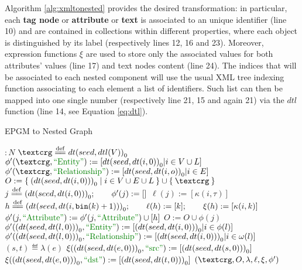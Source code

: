 Algorithm \vref{alg:xmltonested} provides the desired transformation: in particular, each \textbf{tag node} or \textbf{attribute} or \textbf{text} is associated to an unique identifier (line 10) and are contained in collections within different properties, where each object is distinguished by its label (respectively lines 12, 16 and 23). Moreover, expression functions $\xi$ are used to store only the associated values for both attributes' values (line 17) and text nodes content (line 24).
 The indices that will be associated to each nested component will use the usual XML tree indexing function \cite{Liu16} associating to each element a list of identifiers. Such list can then be mapped into one single number (respectively line 21, 15 and again 21) via the $dtl$ function (line 14, see Equation \vref{eq:dtl}). 

\begin{algorithm}[!t]
	\caption{EPGM to Nested Graph}\label{alg:epgmtoN}
	{
		\begin{minipage}{\linewidth}
			\begin{algorithmic}[1]
				 $\colon N$ 
				\State $\ngraph \eqdef {dt(seed,dtl(V))}_0$
				\State $\phi'(\ngraph,\ONTA):=[{dt(seed,dt(i,0))}_0|i\in V\cup L]$
				\State $\phi'(\ngraph,\RELA):=[{dt(seed,dt(i,o))}_0|i\in E]$
				\State $O:= \Set{\zsed{dt(seed,dt(i, 0))}|i\in V\cup E\cup L}\cup\Set{\ngraph}$
				\State $j \overset{\mathrm{def}}{=\mathrel{\mkern-3mu}=} {(dt(seed,dt(i,0)))}_0;\qquad \phi'(j):=[]$
				\State $\ell(j):=[\kappa(i,\tau)]$
				\State $h \overset{\mathrm{def}}{=\mathrel{\mkern-3mu}=} {(dt(seed,dt(i,\texttt{bin}(k)+1)))}_0;\qquad \ell(h):=[k];\qquad \xi(h):=[\kappa(i,k)]$
				\State $\phi'(j,\ATTR):=\phi'(j,\ATTR)\cup[h]$
				\EndFor
				\State $O:=O\cup \phi(j)$
				\EndFor
				\State $\phi'(\zsed{dt(seed,dt(l,0))},\ONTA):=[\zsed{dt(seed,dt(i,0))}|i\in\phi(l)]$
				\State $\phi'(\zsed{dt(seed,dt(l,0))},\RELA):=[\zsed{dt(seed,dt(i,0))}|i\in\omega(l)]$
				\EndFor
				\State $(s,t)\eqdef \lambda(e)$
				\State $\xi(\zsed{dt(seed,dt(e,0))},\SRC):=[\zsed{dt(seed,dt(s,0))}]$
				\State $\xi(\zsed{dt(seed,dt(e,0))},\DST):=[\zsed{dt(seed,dt(t,0))}]$
				\EndFor
				\State \Return $(\ngraph,O,\lambda,\ell,\xi,\phi')$
				\EndFunction
			\end{algorithmic}
	\end{minipage}}
\end{algorithm}
